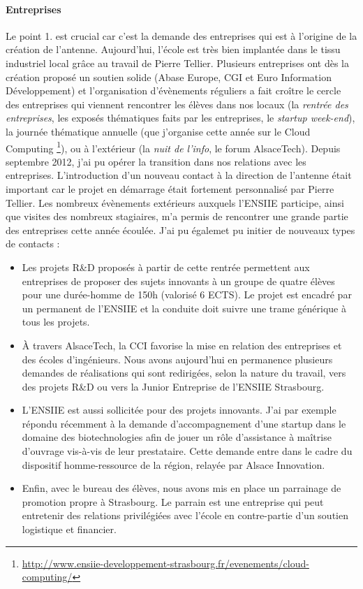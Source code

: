 \documentclass[11pt]{article}
\begin{document}
\paragraph{Entreprises} 
Le point 1. est crucial car c'est la demande des entreprises qui est à l'origine
de la création de l'antenne.  Aujourd'hui,  l'école est très bien implantée dans
le  tissu  industriel local  grâce  au  travail  de Pierre  Tellier.   Plusieurs
entreprises ont dès la création proposé  un soutien solide (Abase Europe, CGI et
Euro Information Développement) et  l'organisation d'évènements réguliers a fait
croître le  cercle des entreprises qui  viennent rencontrer les élèves  dans nos
locaux (la \emph{rentrée des entreprises}, les exposés thématiques faits par les
entreprises, le  \emph{startup week-end}),  la journée thématique  annuelle (que
j'organise cette année sur le Cloud Computing%
\footnote{\url{http://www.ensiie-developpement-strasbourg.fr/evenements/cloud-computing/}}),
ou  à l'extérieur  (la  \emph{nuit  de l'info},  le  forum AlsaceTech).   Depuis
septembre  2012, j'ai  pu  opérer  la transition  dans  nos  relations avec  les
entreprises.  L'introduction  d'un nouveau contact  à la direction  de l'antenne
était  important car  le projet  en démarrage  était fortement  personnalisé par
Pierre Tellier. Les nombreux  évènements extérieurs auxquels l'ENSIIE participe,
ainsi que visites  des nombreux stagiaires, m'a permis de  rencontrer une grande
partie des entreprises cette année écoulée. J'ai pu égalemet pu initier de nouveaux
types de contacts :
\begin{itemize}
\item  Les projets  R\&D  proposés  à partir  de  cette  rentrée permettent  aux
  entreprises de proposer des sujets innovants à un groupe de quatre élèves pour
  une  durée-homme de  150h (valorisé  6 ECTS).   Le projet  est encadré  par un
  permanent de  l'ENSIIE et la conduite  doit suivre une trame  générique à tous
  les projets.

\item  \`A  travers  AlsaceTech,  la  CCI  favorise  la  mise  en  relation  des
  entreprises et des écoles d'ingénieurs.   Nous avons aujourd'hui en permanence
  plusieurs demandes  de réalisations  qui sont redirigées,  selon la  nature du
  travail,  vers des  projets  R\&D  ou vers  la  Junior  Entreprise de  l'ENSIIE
  Strasbourg.

\item L'ENSIIE est aussi sollicitée pour des projets innovants. J'ai par exemple
  répondu récemment à la demande  d'accompagnement d'une startup dans le domaine
  des biotechnologies  afin de jouer  un rôle d'assistance à  maîtrise d'ouvrage
  vis-à-vis de leur prestataire. Cette demande entre dans le cadre du dispositif
  homme-ressource de la région, relayée par Alsace Innovation.

\item Enfin, avec le bureau des élèves, nous avons mis en place un parrainage de
  promotion  propre  à Strasbourg.   Le  parrain  est  une entreprise  qui  peut
  entretenir  des  relations privilégiées  avec  l'école  en contre-partie  d'un
  soutien logistique et financier. 
  

\end{itemize}
\end{document}
